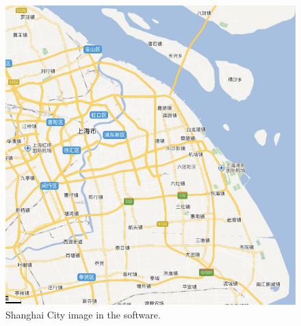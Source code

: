\documentclass[]{IEEEtran}
\begin{document}

\newpage
\begin{figure}[!hbt]
		\vspace{1.7cm}
		\begin{center}
			\includegraphics[width=\columnwidth]{op}
			\caption{Shanghai City image in the software.}
			\label{fig:fw}
		    
		\end{center}
	\end{figure}

%
%
%
%
%
%

\end{document}
